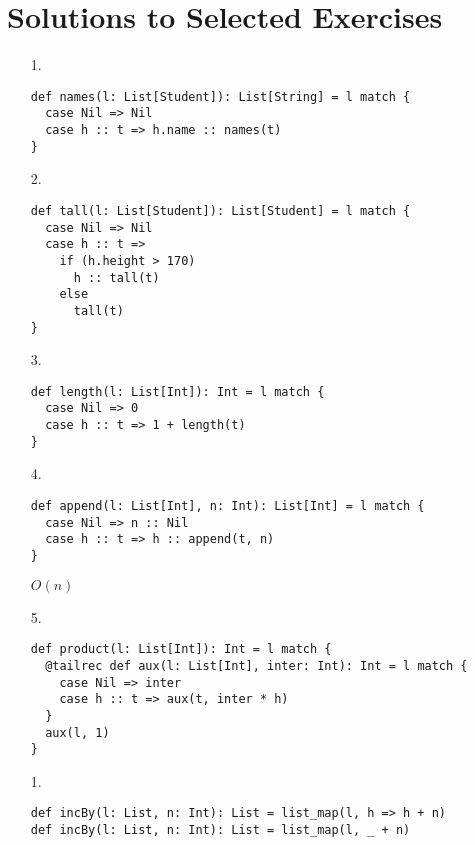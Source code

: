 \setchapterpreamble[u]{\margintoc}
\chapter{Solutions to Selected Exercises}

\textbf{}
\begin{enumerate}
\item[1.]
\begin{verbatim}
def names(l: List[Student]): List[String] = l match {
  case Nil => Nil
  case h :: t => h.name :: names(t)
}
\end{verbatim}
\item[2.]
\begin{verbatim}
def tall(l: List[Student]): List[Student] = l match {
  case Nil => Nil
  case h :: t =>
    if (h.height > 170)
      h :: tall(t)
    else
      tall(t)
}
\end{verbatim}
\item[3.]
\begin{verbatim}
def length(l: List[Int]): Int = l match {
  case Nil => 0
  case h :: t => 1 + length(t)
}
\end{verbatim}
\item[4.]
\begin{verbatim}
def append(l: List[Int], n: Int): List[Int] = l match {
  case Nil => n :: Nil
  case h :: t => h :: append(t, n)
}
\end{verbatim}
$O(n)$
\item[5.]
\begin{verbatim}
def product(l: List[Int]): Int = l match {
  @tailrec def aux(l: List[Int], inter: Int): Int = l match {
    case Nil => inter
    case h :: t => aux(t, inter * h)
  }
  aux(l, 1)
}
\end{verbatim}

\end{enumerate}

\textbf{}

\begin{enumerate}
\item[1.]
\begin{verbatim}
def incBy(l: List, n: Int): List = list_map(l, h => h + n)
def incBy(l: List, n: Int): List = list_map(l, _ + n)
\end{verbatim}
\end{enumerate}

